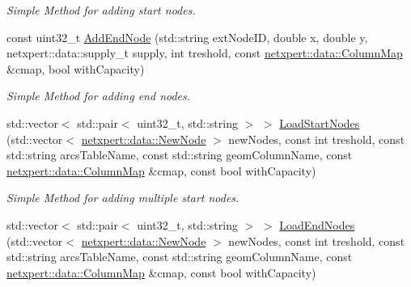 \begin{DoxyCompactItemize}
\begin{DoxyCompactList}\small\item\em Simple Method for adding start nodes. \end{DoxyCompactList}\item 
const uint32\+\_\+t \hyperlink{classnetxpert_1_1InternalNet_adc91c6dd6bb51f0261ba3ff1e62f0b57}{Add\+End\+Node} (std\+::string ext\+Node\+ID, double x, double y, netxpert\+::data\+::supply\+\_\+t supply, int treshold, const \hyperlink{structnetxpert_1_1data_1_1ColumnMap}{netxpert\+::data\+::\+Column\+Map} \&cmap, bool with\+Capacity)\hypertarget{classnetxpert_1_1InternalNet_adc91c6dd6bb51f0261ba3ff1e62f0b57}{}\label{classnetxpert_1_1InternalNet_adc91c6dd6bb51f0261ba3ff1e62f0b57}

\begin{DoxyCompactList}\small\item\em Simple Method for adding end nodes. \end{DoxyCompactList}\item 
std\+::vector$<$ std\+::pair$<$ uint32\+\_\+t, std\+::string $>$ $>$ \hyperlink{classnetxpert_1_1InternalNet_afc56b61890606de9ea83acdad408db39}{Load\+Start\+Nodes} (std\+::vector$<$ \hyperlink{structnetxpert_1_1data_1_1NewNode}{netxpert\+::data\+::\+New\+Node} $>$ new\+Nodes, const int treshold, const std\+::string arcs\+Table\+Name, const std\+::string geom\+Column\+Name, const \hyperlink{structnetxpert_1_1data_1_1ColumnMap}{netxpert\+::data\+::\+Column\+Map} \&cmap, const bool with\+Capacity)\hypertarget{classnetxpert_1_1InternalNet_afc56b61890606de9ea83acdad408db39}{}\label{classnetxpert_1_1InternalNet_afc56b61890606de9ea83acdad408db39}

\begin{DoxyCompactList}\small\item\em Simple Method for adding multiple start nodes. \end{DoxyCompactList}\item 
std\+::vector$<$ std\+::pair$<$ uint32\+\_\+t, std\+::string $>$ $>$ \hyperlink{classnetxpert_1_1InternalNet_a0b6b10e311bdf4495af093fcc68690ad}{Load\+End\+Nodes} (std\+::vector$<$ \hyperlink{structnetxpert_1_1data_1_1NewNode}{netxpert\+::data\+::\+New\+Node} $>$ new\+Nodes, const int treshold, const std\+::string arcs\+Table\+Name, const std\+::string geom\+Column\+Name, const \hyperlink{structnetxpert_1_1data_1_1ColumnMap}{netxpert\+::data\+::\+Column\+Map} \&cmap, const bool with\+Capacity)\hypertarget{classnetxpert_1_1InternalNet_a0b6b10e311bdf4495af093fcc68690ad}{}\label{classnetxpert_1_1InternalNet_a0b6b10e311bdf4495af093fcc68690ad}


\end{DoxyCompactItemize}
